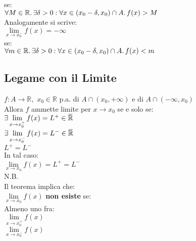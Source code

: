 \documentclass[a4paper, twoside, italian, 11pt]{book}
\newcommand{\overbar}[1] {\mkern 1.5mu\overline{\mkern-1.5mu#1\mkern-1.5mu}\mkern 1.5mu}
\newcommand{\R}{\mathbb{R}}
\begin{document}
\noindent
se: \\

$\forall M \in \R \ldotp \exists \delta > 0 : \forall x \in (x_0 - \delta, x_0) \cap A \ldotp f(x) > M$ \\

\noindent
Analogamente si scrive: \\

$\lim\limits_{x \to x_0^-} f(x) = -\infty$ \\

\noindent
se: \\

$\forall m \in \R \ldotp \exists \delta > 0 : \forall x \in (x_0 - \delta, x_0) \cap A \ldotp f(x) < m$


\subsection{Legame con il Limite}

\noindent
$f : A \rightarrow \R,$ $x_0 \in \R$ p.a. di $A \cap (x_0, +\infty)$ e di $A \cap (-\infty, x_0)$ \\

\noindent
Allora $f$ ammette limite per $x \to x_0$ se e solo se: \\

$\exists \lim\limits_{x \to x_0^+} f(x) = L^+ \in \overbar\R$ \\

$\exists \lim\limits_{x \to x_0^-} f(x) = L^- \in \overbar\R$ \\

$L^+ = L^-$ \\

\noindent
In tal caso: \\

$\lim\limits_{x \to x_0} f(x) = L^+ = L^-$ \\

\noindent
N.B. \\
Il teorema implica che: \\

$\lim\limits_{x \to x_0} f(x)$ \textbf{non esiste} se: \\

\noindent
Almeno uno fra: \\

$\lim\limits_{x \to x_0^+} f(x)$ \\

$\lim\limits_{x \to x_0^-} f(x)$ \\
\end{document}
